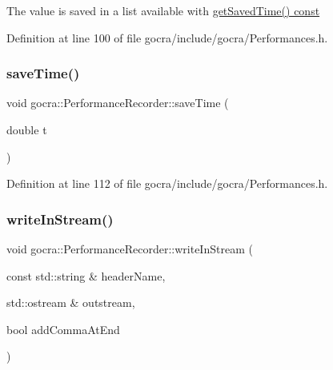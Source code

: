 The value is saved in a list available with \hyperlink{classgocra_1_1PerformanceRecorder_a455aa6ce738511632d968b16632f8994}{get\+Saved\+Time() const} 

Definition at line 100 of file gocra/include/gocra/\+Performances.\+h.

\hypertarget{classgocra_1_1PerformanceRecorder_aeb8e111c5e7a65ed384d39569ab1bbef}{}\label{classgocra_1_1PerformanceRecorder_aeb8e111c5e7a65ed384d39569ab1bbef} 
\subsubsection{\texorpdfstring{save\+Time()}{saveTime()}}
{\footnotesize\ttfamily void gocra\+::\+Performance\+Recorder\+::save\+Time (\begin{DoxyParamCaption}\item[{double}]{t }\end{DoxyParamCaption})\hspace{0.3cm}{\ttfamily [inline]}}



Definition at line 112 of file gocra/include/gocra/\+Performances.\+h.

\hypertarget{classgocra_1_1PerformanceRecorder_a47f171510d0f7129bf588fe5c2417043}{}\label{classgocra_1_1PerformanceRecorder_a47f171510d0f7129bf588fe5c2417043} 
\subsubsection{\texorpdfstring{write\+In\+Stream()}{writeInStream()}}
{\footnotesize\ttfamily void gocra\+::\+Performance\+Recorder\+::write\+In\+Stream (\begin{DoxyParamCaption}\item[{const std\+::string \&}]{header\+Name,  }\item[{std\+::ostream \&}]{outstream,  }\item[{bool}]{add\+Comma\+At\+End }\end{DoxyParamCaption})\hspace{0.3cm}{\ttfamily [inline]}}

